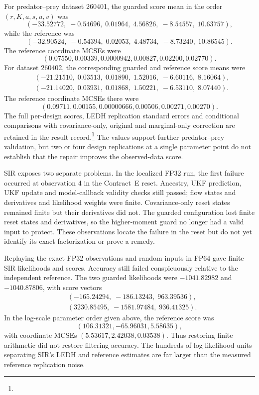 For predator--prey dataset 260401, the guarded score mean in the order
\((r,K,a,s,u,v)\) was
\[
 (-33.52772,\;-0.54696,\;0.01964,\;4.56826,\;-8.54557,\;10.63757),
\]
while the reference was
\[
 (-32.90524,\;-0.54394,\;0.02053,\;4.48734,\;-8.73240,\;10.86545).
\]
The reference coordinate MCSEs were
\[
 (0.07550,0.00339,0.0000942,0.00827,0.02200,0.02770).
\]
For dataset 260402, the corresponding guarded and reference score means were
\begin{align*}
 &(-21.21510,\;0.03513,\;0.01890,\;1.52016,\;-6.60116,\;8.16064),\\
 &(-21.14020,\;0.03931,\;0.01868,\;1.50221,\;-6.53110,\;8.07440).
\end{align*}
The reference coordinate MCSEs there were
\[
 (0.09711,0.00155,0.00000666,0.00506,0.00271,0.00270).
\]
The full per-design scores, LEDH replication standard errors and conditional
comparisons with covariance-only, original and marginal-only correction are
retained in the result record.\footnote{}
The values support further predator--prey validation, but two or four design
replications at a single parameter point do not establish that the repair
improves the observed-data score.

SIR exposes two separate problems.  In the localized FP32 run, the first
failure occurred at observation 4 in the Contract~E reset.  Ancestry, UKF
prediction, UKF update and model-callback validity checks still passed; flow
states and derivatives and likelihood weights were finite.  Covariance-only
reset states remained finite but their derivatives did not.  The guarded
configuration lost finite reset states and derivatives, so the higher-moment
guard no longer had a valid input to protect.  These observations locate the
failure in the reset but do not yet identify its exact factorization or
prove a remedy.

Replaying the exact FP32 observations and random inputs in FP64 gave finite
SIR likelihoods and scores.  Accuracy still failed conspicuously relative to
the independent reference.  The two guarded likelihoods were \(-1041.82982\)
and \(-1040.87806\), with score vectors
\begin{align*}
 &(-165.24294,\;-186.13243,\;963.39536),\\
 &(3230.85495,\;-1581.97484,\;936.41325).
\end{align*}
In the log-scale parameter order given above, the reference score was
\[
 (106.31321,-65.96031,5.58635),
\]
with coordinate MCSEs \((5.53617,2.42038,0.03538)\).
Thus restoring finite arithmetic did not restore filtering accuracy.  The
hundreds of log-likelihood units separating SIR's LEDH and reference estimates
are far larger than the measured reference replication noise.

